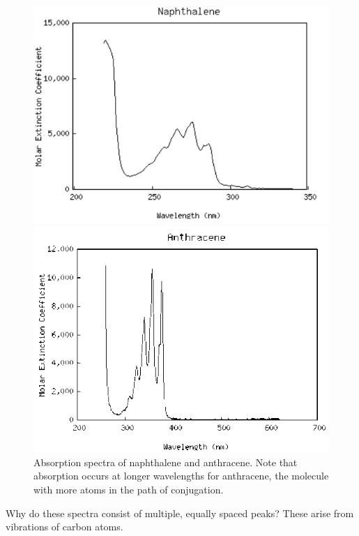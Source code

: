 \begin{figure}[h]
	\centering
	\begin{minipage}[c]{0.45\textwidth}
	\includegraphics[width=\textwidth]{./figures/Topic6/Fig6-11a.png}
	\end{minipage}
	\begin{minipage}[c]{0.45\textwidth}
	\includegraphics[width=\textwidth]{./figures/Topic6/Fig6-11b.png}
	\end{minipage}
	\caption{Absorption spectra of naphthalene and anthracene.  Note that absorption occurs at longer wavelengths for anthracene, the molecule with more atoms in the path of conjugation.}
	\label{Fig6-11}
\end{figure} 
Why do these spectra consist of multiple, equally spaced peaks?  These arise from vibrations of carbon atoms.

